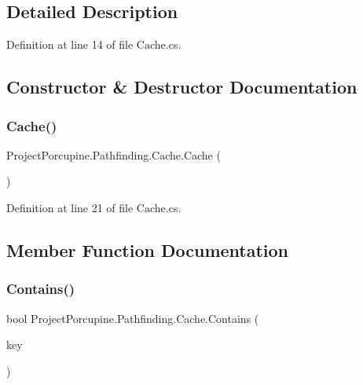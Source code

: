 \subsection{Detailed Description}


Definition at line 14 of file Cache.\+cs.



\subsection{Constructor \& Destructor Documentation}
\mbox{\label{class_project_porcupine_1_1_pathfinding_1_1_cache_a6eea1c6f28fe23ec3067c7283fdadbfa}} 
\subsubsection{\texorpdfstring{Cache()}{Cache()}}
{\footnotesize\ttfamily Project\+Porcupine.\+Pathfinding.\+Cache.\+Cache (\begin{DoxyParamCaption}{ }\end{DoxyParamCaption})}



Definition at line 21 of file Cache.\+cs.



\subsection{Member Function Documentation}
\mbox{\label{class_project_porcupine_1_1_pathfinding_1_1_cache_a436c50b8874a554d71e5c86b6a96a882}} 
\subsubsection{\texorpdfstring{Contains()}{Contains()}\hspace{0.1cm}{\footnotesize\ttfamily [1/2]}}
{\footnotesize\ttfamily bool Project\+Porcupine.\+Pathfinding.\+Cache.\+Contains (\begin{DoxyParamCaption}\item[{\hyperlink{class_project_porcupine_1_1_pathfinding_1_1_cache_1_1_cache_key}{Cache\+Key}}]{key }\end{DoxyParamCaption})}



